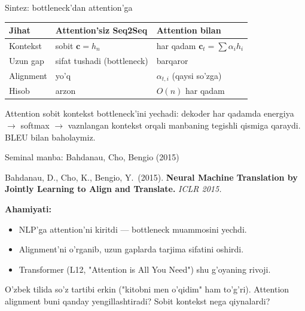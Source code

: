 \documentclass[aspectratio=169,11pt]{beamer}
\begin{document}
\begin{frame}{Sintez: bottleneck'dan attention'ga}
  \begin{center}\small
  \begin{tabular}{p{3.2cm}p{4.0cm}p{4.0cm}}
    \toprule
    \textbf{Jihat} & \textbf{Attention'siz Seq2Seq} & \textbf{Attention bilan} \\
    \midrule
    Kontekst & sobit $\mathbf{c}=h_n$ & har qadam $\mathbf{c}_t=\sum\alpha_i h_i$ \\
    Uzun gap & sifat tushadi (bottleneck) & barqaror \\
    Alignment & yo'q & $\alpha_{t,i}$ (qaysi so'zga) \\
    Hisob & arzon & $O(n)$ har qadam \\
    \bottomrule
  \end{tabular}
  \end{center}
  \vspace{4pt}
  \begin{tcolorbox}[okbox,title=Asosiy g'oya,top=2pt,bottom=2pt]
    \footnotesize
    Attention sobit kontekst bottleneck'ini yechadi: dekoder har qadamda
    energiya $\to$ softmax $\to$ vaznlangan kontekst orqali manbaning tegishli
    qismiga qaraydi. BLEU bilan baholaymiz.
  \end{tcolorbox}
\end{frame}

\begin{frame}{Seminal manba: Bahdanau, Cho, Bengio (2015)}
  \begin{tcolorbox}[defbox,title=Manba]
    \small
    Bahdanau, D., Cho, K., Bengio, Y.\ (2015). \textbf{Neural Machine Translation
    by Jointly Learning to Align and Translate.} \textit{ICLR 2015.}
  \end{tcolorbox}
  \vspace{5pt}
  \textbf{Ahamiyati:}
  \begin{itemize}\small\setlength\itemsep{3pt}
    \item NLP'ga attention'ni kiritdi --- bottleneck muammosini yechdi.
    \item Alignment'ni o'rganib, uzun gaplarda tarjima sifatini oshirdi.
    \item Transformer (L12, "Attention is All You Need") shu g'oyaning rivoji.
  \end{itemize}
  \vspace{5pt}
  \begin{tcolorbox}[warnbox,title=Muhokama savoli (P11 gacha o'ylang)]
    \small
    O'zbek tilida so'z tartibi erkin ("kitobni men o'qidim" ham to'g'ri).
    Attention alignment buni qanday yengillashtiradi? Sobit kontekst nega
    qiynalardi?
  \end{tcolorbox}
\end{frame}
\end{document}
